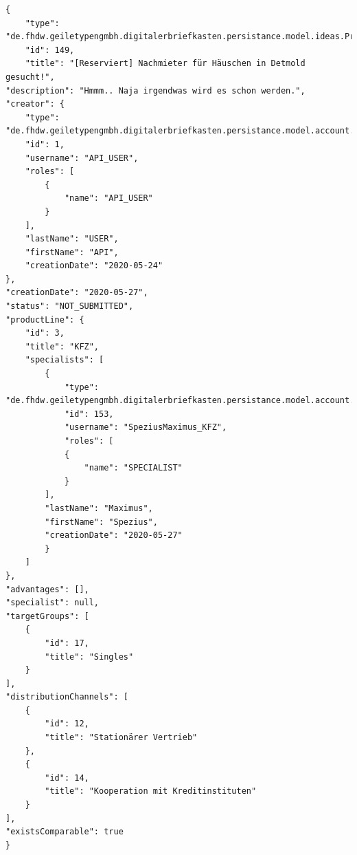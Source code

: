 \label{Anhang:Schnittstellen2}
\begin{verbatim}
{
    "type": "de.fhdw.geiletypengmbh.digitalerbriefkasten.persistance.model.ideas.ProductIdea",
    "id": 149,
    "title": "[Reserviert] Nachmieter für Häuschen in Detmold gesucht!",
"description": "Hmmm.. Naja irgendwas wird es schon werden.",
"creator": {
    "type": "de.fhdw.geiletypengmbh.digitalerbriefkasten.persistance.model.account.User",
    "id": 1,
    "username": "API_USER",
    "roles": [
        {
            "name": "API_USER"
        }
    ],
    "lastName": "USER",
    "firstName": "API",
    "creationDate": "2020-05-24"
},
"creationDate": "2020-05-27",
"status": "NOT_SUBMITTED",
"productLine": {
    "id": 3,
    "title": "KFZ",
    "specialists": [
        {
            "type": "de.fhdw.geiletypengmbh.digitalerbriefkasten.persistance.model.account.Specialist",
            "id": 153,
            "username": "SpeziusMaximus_KFZ",
            "roles": [
            {
                "name": "SPECIALIST"
            }
        ],
        "lastName": "Maximus",
        "firstName": "Spezius",
        "creationDate": "2020-05-27"
        }
    ]
},
"advantages": [],
"specialist": null,
"targetGroups": [
    {
        "id": 17,
        "title": "Singles"
    }
],
"distributionChannels": [
    {
        "id": 12,
        "title": "Stationärer Vertrieb"
    },
    {
        "id": 14,
        "title": "Kooperation mit Kreditinstituten"
    }
],
"existsComparable": true
}
\end{verbatim}
\label{Anhang:Klassendiagramme}

